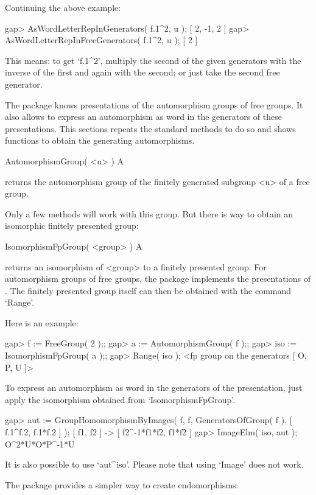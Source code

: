 Continuing the above example:

\beginexample
gap> AsWordLetterRepInGenerators( f.1^2, u );    
[ 2, -1, 2 ]
gap> AsWordLetterRepInFreeGenerators( f.1^2, u );
[ 2 ]
\endexample

This means: to get `f.1^2', multiply the second of the given generators
with the inverse of the first and again with the second; or just take
the second free generator.


The {\FGA} package knows presentations of the automorphism groups of free
groups. It also allows to express an automorphism as word in the
generators of these presentations.
This sections repeats the {\GAP} standard methods to do so and shows
functions to obtain the generating automorphisms.

\>AutomorphismGroup( <u> ) A

returns the automorphism group of the finitely generated subgroup <u>
of a free group.

Only a few methods will work with this group. But there is way to
obtain an isomorphic finitely presented group:

\>IsomorphismFpGroup( <group> ) A

returns an isomorphism of <group> to a finitely presented group.  
For automorphism groups of free groups, the {\FGA} package implements
the presentations of \cite{Neumann33}.
The finitely presented group itself can then be obtained with the
command `Range'.

Here is an example:

\beginexample
gap> f := FreeGroup( 2 );;
gap> a := AutomorphismGroup( f );;
gap> iso := IsomorphismFpGroup( a );;
gap> Range( iso );
<fp group on the generators [ O, P, U ]>
\endexample

To express an automorphism as word in the generators of the
presentation, just apply the isomorphism obtained from
`IsomorphismFpGroup'.

\beginexample
gap> aut := GroupHomomorphismByImages( f, f,
               GeneratorsOfGroup( f ), [ f.1^f.2, f.1*f.2 ] );
[ f1, f2 ] -> [ f2^-1*f1*f2, f1*f2 ]
gap> ImageElm( iso, aut );
O^2*U*O*P^-1*U
\endexample

It is also possible to use `aut^iso'.
Please note that using `Image' does not work.

The {\FGA} package provides a simpler way to create endomorphisms:

